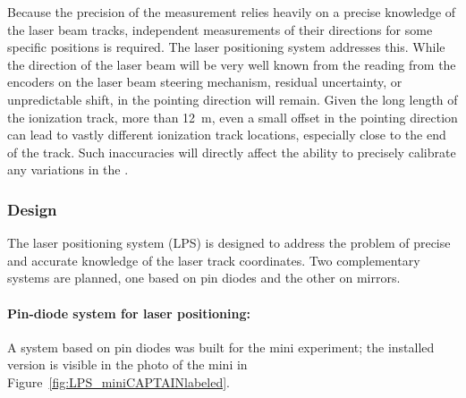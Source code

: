 

Because the precision of the \efield measurement relies heavily on a precise knowledge of the laser beam tracks, independent measurements of their directions for some specific positions is required. The laser positioning system addresses this. %
While the direction of the laser beam will be very well known from the reading from the encoders on the laser beam steering mechanism,  residual uncertainty, or unpredictable shift, in the pointing direction will remain. 
Given the long length of the ionization track, more than \SI{12}{\m}, even a small offset in the pointing direction can lead to vastly different ionization track locations, especially close to the end of the track. Such inaccuracies will directly affect the ability to precisely calibrate any variations in the \efield.

\subsubsection{Design}

The laser positioning system (LPS)  is designed to address the problem of precise and accurate knowledge of the laser track coordinates. %
Two complementary systems are planned, one based on pin diodes and the other on mirrors.

\paragraph{Pin-diode system for laser positioning:}

A system based on pin diodes 
was built for the mini experiment; the installed version is visible in the photo of the mini  in  Figure~\ref{fig:LPS_miniCAPTAINlabeled}.  


